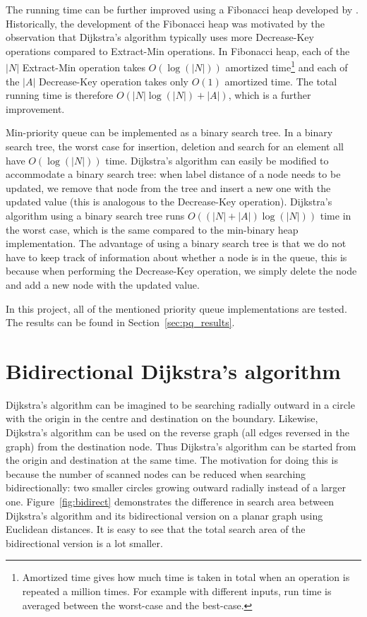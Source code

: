 The running time can be further improved using a Fibonacci heap developed by \citet{Fredman}.
Historically, the development of the Fibonacci heap was motivated by the observation that Dijkstra's algorithm typically uses more Decrease-Key operations compared to Extract-Min operations.
In Fibonacci heap, each of the $|N|$ Extract-Min operation takes $O(\log(|N|))$ amortized time\footnote{Amortized time gives how much time is taken in total when an operation is repeated a million times. For example with different inputs, run time is averaged between the worst-case and the best-case.}
and each of the $|A|$ Decrease-Key operation takes only $O(1)$ amortized time.
The total running time is therefore $O(|N| \log(|N|)+|A|)$,
which is a further improvement.

Min-priority queue can be implemented as a binary search tree.
In a binary search tree, the worst case for insertion, deletion and search for an element all have $O(\log(|N|))$ time.
Dijkstra's algorithm can easily be modified to accommodate a binary search tree:
when label distance of a node needs to be updated,
we remove that node from the tree and insert a new one with the updated value (this is analogous to the Decrease-Key operation).
Dijkstra's algorithm using a binary search tree runs $O((|N|+|A|)\log(|N|))$ time in the worst case, which is the same compared to the min-binary heap implementation.
The advantage of using a binary search tree is that we do not have to keep track of information about whether a node is in the queue,
this is because when performing the Decrease-Key operation,
we simply delete the node and add a new node with the updated value.

In this project, all of the mentioned priority queue implementations are tested.
The results can be found in Section~\ref{sec:pq_results}.

\section{Bidirectional Dijkstra's algorithm} \label{section:bidirectional}
Dijkstra's algorithm can be imagined to be searching radially outward in a circle with the origin in the centre and destination on the boundary.
Likewise, Dijkstra's algorithm can be used on the reverse graph (all edges reversed in the graph) from the destination node.
Thus Dijkstra's algorithm can be started from the origin and destination at the same time.
The motivation for doing this is because the number of scanned nodes can be reduced when searching bidirectionally:
two smaller circles growing outward radially instead of a larger one.
Figure~\ref{fig:bidirect} demonstrates the difference in search area between Dijkstra's algorithm and its bidirectional version on a planar graph using Euclidean distances.
It is easy to see that the total search area of the bidirectional version is a lot smaller.

